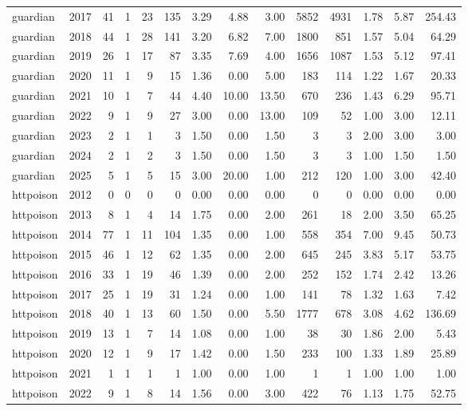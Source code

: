 \begin{table}[htbp]
\begin{tabular}{lrrrrrrrrrrrrr}
guardian & 2017 & 41 & 1 & 23 & 135 & 3.29 & 4.88 & 3.00 & 5852 & 4931 & 1.78 & 5.87 & 254.43 \\
guardian & 2018 & 44 & 1 & 28 & 141 & 3.20 & 6.82 & 7.00 & 1800 & 851 & 1.57 & 5.04 & 64.29 \\
guardian & 2019 & 26 & 1 & 17 & 87 & 3.35 & 7.69 & 4.00 & 1656 & 1087 & 1.53 & 5.12 & 97.41 \\
guardian & 2020 & 11 & 1 & 9 & 15 & 1.36 & 0.00 & 5.00 & 183 & 114 & 1.22 & 1.67 & 20.33 \\
guardian & 2021 & 10 & 1 & 7 & 44 & 4.40 & 10.00 & 13.50 & 670 & 236 & 1.43 & 6.29 & 95.71 \\
guardian & 2022 & 9 & 1 & 9 & 27 & 3.00 & 0.00 & 13.00 & 109 & 52 & 1.00 & 3.00 & 12.11 \\
guardian & 2023 & 2 & 1 & 1 & 3 & 1.50 & 0.00 & 1.50 & 3 & 3 & 2.00 & 3.00 & 3.00 \\
guardian & 2024 & 2 & 1 & 2 & 3 & 1.50 & 0.00 & 1.50 & 3 & 3 & 1.00 & 1.50 & 1.50 \\
guardian & 2025 & 5 & 1 & 5 & 15 & 3.00 & 20.00 & 1.00 & 212 & 120 & 1.00 & 3.00 & 42.40 \\
httpoison & 2012 & 0 & 0 & 0 & 0 & 0.00 & 0.00 & 0.00 & 0 & 0 & 0.00 & 0.00 & 0.00 \\
httpoison & 2013 & 8 & 1 & 4 & 14 & 1.75 & 0.00 & 2.00 & 261 & 18 & 2.00 & 3.50 & 65.25 \\
httpoison & 2014 & 77 & 1 & 11 & 104 & 1.35 & 0.00 & 1.00 & 558 & 354 & 7.00 & 9.45 & 50.73 \\
httpoison & 2015 & 46 & 1 & 12 & 62 & 1.35 & 0.00 & 2.00 & 645 & 245 & 3.83 & 5.17 & 53.75 \\
httpoison & 2016 & 33 & 1 & 19 & 46 & 1.39 & 0.00 & 2.00 & 252 & 152 & 1.74 & 2.42 & 13.26 \\
httpoison & 2017 & 25 & 1 & 19 & 31 & 1.24 & 0.00 & 1.00 & 141 & 78 & 1.32 & 1.63 & 7.42 \\
httpoison & 2018 & 40 & 1 & 13 & 60 & 1.50 & 0.00 & 5.50 & 1777 & 678 & 3.08 & 4.62 & 136.69 \\
httpoison & 2019 & 13 & 1 & 7 & 14 & 1.08 & 0.00 & 1.00 & 38 & 30 & 1.86 & 2.00 & 5.43 \\
httpoison & 2020 & 12 & 1 & 9 & 17 & 1.42 & 0.00 & 1.50 & 233 & 100 & 1.33 & 1.89 & 25.89 \\
httpoison & 2021 & 1 & 1 & 1 & 1 & 1.00 & 0.00 & 1.00 & 1 & 1 & 1.00 & 1.00 & 1.00 \\
httpoison & 2022 & 9 & 1 & 8 & 14 & 1.56 & 0.00 & 3.00 & 422 & 76 & 1.13 & 1.75 & 52.75 \\

\end{tabular}
\end{table}
